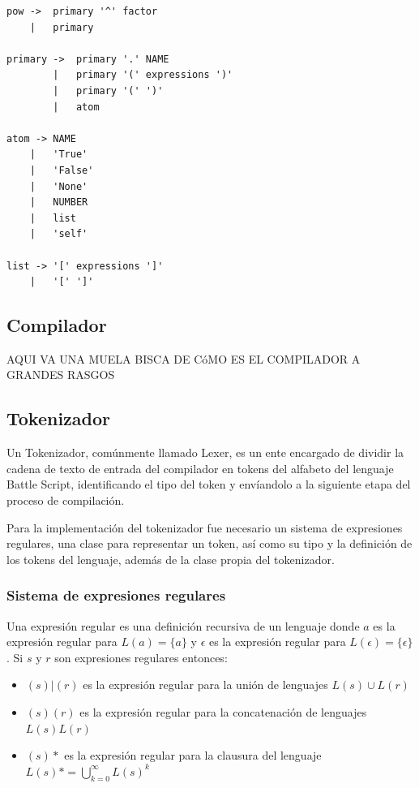 \begin{verbatim}
pow ->  primary '^' factor              
    |   primary

primary ->  primary '.' NAME            
        |   primary '(' expressions ')'        
        |   primary '(' ')'             
        |   atom

atom -> NAME                            
    |   'True'                          
    |   'False'                         
    |   'None'                          
    |   NUMBER                          
    |   list
    |   'self'

list -> '[' expressions ']'             
    |   '[' ']'                         
\end{verbatim}

\subsection{Compilador}

AQUI VA UNA MUELA BISCA DE CóMO ES EL COMPILADOR A GRANDES RASGOS

\subsection{Tokenizador}

Un Tokenizador, comúnmente llamado Lexer, es un ente encargado de dividir la cadena de texto de entrada del compilador en tokens del alfabeto del lenguaje Battle Script, identificando el tipo del token y envíandolo a la siguiente etapa del proceso de compilación.

Para la implementación del tokenizador fue necesario un sistema de expresiones regulares, una clase para representar un token, así como su tipo y la definición de los tokens del lenguaje, además de la clase propia del tokenizador. 

\subsubsection{Sistema de expresiones regulares}

Una expresión regular es una definición recursiva de un lenguaje donde $a$ es la expresión regular para $L(a) = \{a\}$ y $\epsilon$ es la expresión regular para $L(\epsilon) = \{\epsilon\}$. Si $s$ y $r$ son expresiones regulares entonces:

\begin{itemize}
    \item $(s)|(r)$ es la expresión regular para la unión de lenguajes $L(s) \cup L(r)$
    \item $(s)(r)$ es la expresión regular para la concatenación de lenguajes $L(s)L(r)$
    \item $(s)*$ es la expresión regular para la clausura del lenguaje $L(s)* = \bigcup\limits_{k=0}^{\infty} L(s)^k$
\end{itemize}

